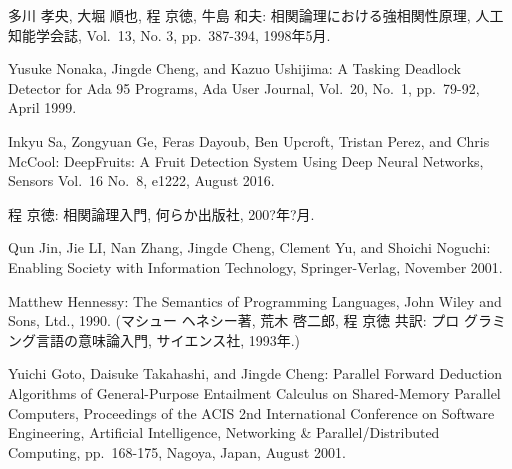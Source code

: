\documentclass[12pt,dvipdfmx]{jreport}
\begin{document}
\begin{thebibliography}{99}
\label{sannkoubunnkenn_chapter}

%


多川 孝央, 大堀 順也, 程 京徳, 牛島 和夫: 相関論理における強相関性原理,
        人工知能学会誌, Vol.\ 13, No. 3, pp.\ 387-394, 1998年5月.

Yusuke Nonaka, Jingde Cheng, and Kazuo Ushijima: A Tasking Deadlock
        Detector for Ada 95 Programs, Ada User Journal, Vol.\ 20, No.\ 1,
        pp.\ 79-92, April 1999.

        Inkyu Sa, Zongyuan Ge, Feras Dayoub, Ben Upcroft, Tristan Perez, and Chris McCool: DeepFruits: A Fruit Detection System Using Deep Neural Networks, Sensors Vol.\ 16 No.\ 8, e1222, August 2016.

        
程 京徳: 相関論理入門, 何らか出版社, 200?年?月.

Qun Jin, Jie LI, Nan Zhang, Jingde Cheng, Clement Yu, and Shoichi
        Noguchi: Enabling Society with Information Technology,
        Springer-Verlag, November 2001.

Matthew Hennessy: The Semantics of Programming Languages, John Wiley and
Sons, Ltd., 1990. (マシュー ヘネシー著, 荒木 啓二郎, 程 京徳 共訳: プロ
グラミング言語の意味論入門, サイエンス社, 1993年.)

Yuichi Goto, Daisuke Takahashi, and Jingde Cheng: Parallel Forward
        Deduction Algorithms of General-Purpose Entailment Calculus on
        Shared-Memory Parallel Computers, Proceedings of the ACIS 2nd
        International Conference on Software Engineering, Artificial
        Intelligence, Networking \& Parallel/Distributed Computing,
        pp.\ 168-175, Nagoya, Japan, August 2001.


\end{thebibliography}
\end{document}
